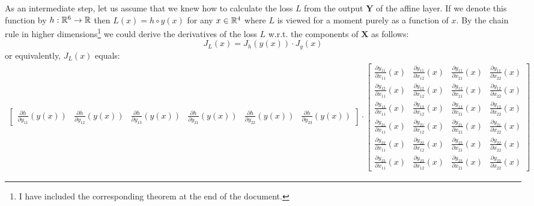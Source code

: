 \documentclass{article}
\begin{document}
\vspace{0.1cm}
\noindent 
As an intermediate step, let us assume that we knew how to calculate the loss \(L\) from the 
output \(\mathbf{Y}\) of the affine layer. If we denote this function by \(h : \mathbb{R}^{6} \rightarrow \mathbb{R}\)
then \( L(x) = h \circ y(x) \) for any \(x \in \mathbb{R}^{4}\) where \(L\) is viewed for a moment 
purely as a function of \(x\). By the chain rule in higher dimensions\footnote{I have included the
corresponding theorem at the end of the document.} 
we could derive the derivatives of the loss \(L\) w.r.t. the components of \(\mathbf{X}\) as follows:
\[
    J_{L}(x) = J_{h}(y(x)) \cdot J_{y}(x)
\]
or equivalently, \(J_{L}(x)\) equals:
\setlength{\arraycolsep}{0.2pt}
\renewcommand{\arraystretch}{1.5}
\begin{align*}
    \begin{bmatrix}
        \frac{\partial h}{\partial y_{11}}(y(x)) & \frac{\partial h}{\partial y_{12}}(y(x)) & 
        \frac{\partial h}{\partial y_{13}}(y(x)) & \frac{\partial h}{\partial y_{21}}(y(x)) & 
        \frac{\partial h}{\partial y_{22}}(y(x)) & \frac{\partial h}{\partial y_{23}}(y(x))
    \end{bmatrix} 
    \cdot 
    \begin{bmatrix}
        \frac{\partial y_{11}}{\partial x_{11}}(x) & \frac{\partial y_{11}}{\partial x_{12}}(x) &
        \frac{\partial y_{11}}{\partial x_{21}}(x) & \frac{\partial y_{11}}{\partial x_{22}}(x) \\
        \frac{\partial y_{12}}{\partial x_{11}}(x) & \frac{\partial y_{12}}{\partial x_{12}}(x) &
        \frac{\partial y_{12}}{\partial x_{21}}(x) & \frac{\partial y_{12}}{\partial x_{22}}(x) \\
        \frac{\partial y_{13}}{\partial x_{11}}(x) & \frac{\partial y_{13}}{\partial x_{12}}(x) &
        \frac{\partial y_{13}}{\partial x_{21}}(x) & \frac{\partial y_{13}}{\partial x_{22}}(x) \\
        \frac{\partial y_{21}}{\partial x_{11}}(x) & \frac{\partial y_{21}}{\partial x_{12}}(x) &
        \frac{\partial y_{21}}{\partial x_{21}}(x) & \frac{\partial y_{21}}{\partial x_{22}}(x) \\
        \frac{\partial y_{22}}{\partial x_{11}}(x) & \frac{\partial y_{22}}{\partial x_{12}}(x) &
        \frac{\partial y_{22}}{\partial x_{21}}(x) & \frac{\partial y_{22}}{\partial x_{22}}(x) \\
        \frac{\partial y_{23}}{\partial x_{11}}(x) & \frac{\partial y_{23}}{\partial x_{12}}(x) &
        \frac{\partial y_{23}}{\partial x_{21}}(x) & \frac{\partial y_{23}}{\partial x_{22}}(x)
    \end{bmatrix}
\end{align*}
\end{document}
